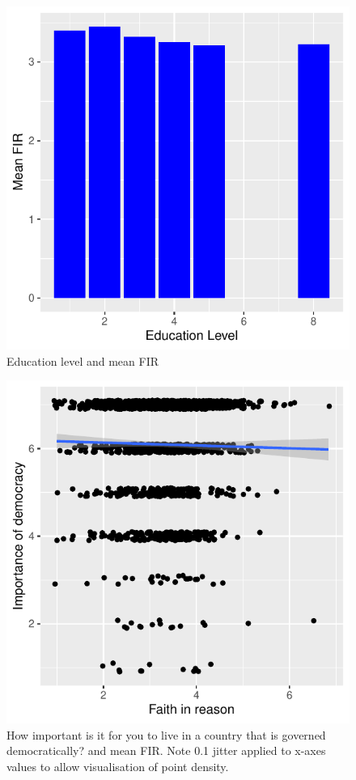 \documentclass[
  ,jou,floatsintext]{apa6}
\begin{document}
\begin{figure}

{\centering \includegraphics[width=0.75\linewidth]{faithinreason_files/figure-latex/education-1} 

}

\caption{Education level and mean FIR}\label{fig:education}
\end{figure}
\begin{figure}

{\centering \includegraphics[width=0.75\linewidth]{faithinreason_files/figure-latex/democract-1} 

}

\caption{How important is it for you to live in a country that is governed democratically? and mean FIR. Note 0.1 jitter applied to x-axes values to allow visualisation of point density.}\label{fig:democract}
\end{figure}
\end{document}
